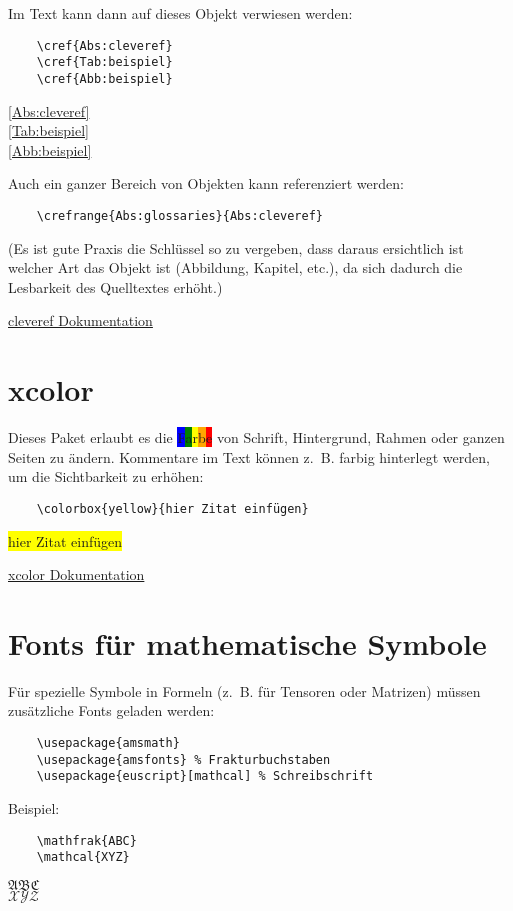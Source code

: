 Im Text kann dann auf dieses Objekt verwiesen werden:
\begin{verbatim}
	\cref{Abs:cleveref}
	\cref{Tab:beispiel}
	\cref{Abb:beispiel}
\end{verbatim}
\cref{Abs:cleveref}\\
\cref{Tab:beispiel}\\
\cref{Abb:beispiel}

Auch ein ganzer Bereich von Objekten kann referenziert werden:
\begin{verbatim}
	\crefrange{Abs:glossaries}{Abs:cleveref}
\end{verbatim}

(Es ist gute Praxis die Schlüssel so zu vergeben, dass daraus ersichtlich ist welcher Art das Objekt ist (Abbildung, Kapitel, etc.), da sich dadurch die Lesbarkeit des Quelltextes erhöht.)

\hyperlink{https://ctan.org/pkg/cleveref?lang=de}{cleveref Dokumentation}

\section{xcolor}
Dieses Paket erlaubt es die \colorbox{blue}{F}\colorbox{green}{a}\colorbox{yellow}{r}\colorbox{orange}{b}\colorbox{red}{e} von Schrift, Hintergrund, Rahmen oder ganzen Seiten zu ändern. Kommentare im Text können z.~B. farbig hinterlegt werden, um die Sichtbarkeit zu erhöhen:
\begin{verbatim}
	\colorbox{yellow}{hier Zitat einfügen}
\end{verbatim}
\colorbox{yellow}{hier Zitat einfügen}

\hyperlink{https://ctan.org/pkg/xcolor?lang=de}{xcolor Dokumentation}

\section{Fonts für mathematische Symbole}
Für spezielle Symbole in Formeln (z.~B. für Tensoren oder Matrizen) müssen zusätzliche Fonts geladen werden:
\begin{verbatim}
	\usepackage{amsmath}
	\usepackage{amsfonts} % Frakturbuchstaben
	\usepackage{euscript}[mathcal] % Schreibschrift
\end{verbatim}

Beispiel:
\begin{verbatim}
	\mathfrak{ABC}
	\mathcal{XYZ}
\end{verbatim}
$\mathfrak{ABC}$\\
$\mathcal{XYZ}$